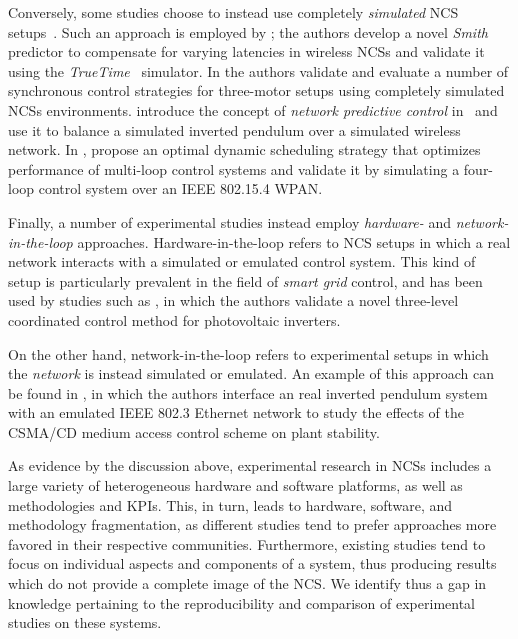 Conversely, some studies choose to instead use completely \emph{simulated} \ac{NCS} setups~\cite{Andersson2005Simulation,Eyisi2012NCSWT}.
Such an approach is employed by \textcite{Du2009Smith}; the authors develop a novel \emph{Smith} predictor to compensate for varying latencies in wireless \acp{NCS} and validate it using the \emph{TrueTime}~\cite{Henriksson2002TrueTime} simulator.
In \textcite{Chen2015synccontrol} the authors validate and evaluate a number of synchronous control strategies for three-motor setups using completely simulated \acp{NCS} environments.
\citeauthor{Wu2012NPC} introduce the concept of \emph{network predictive control} in\ \cite{Wu2012NPC} and use it to balance a simulated inverted pendulum over a simulated wireless network.
In \cite{Ma2019DynamicSched}, \citeauthor{Ma2019DynamicSched} propose an optimal dynamic scheduling strategy that optimizes performance of multi-loop control systems and validate it by simulating a four-loop control system over an IEEE 802.15.4 \ac{WPAN}.


Finally, a number of experimental studies instead employ \emph{hardware-} and \emph{network-in-the-loop} approaches.
Hardware-in-the-loop refers to \ac{NCS} setups in which a real network interacts with a simulated or emulated control system.
This kind of setup is particularly prevalent in the field of \emph{smart grid} control, and has been used by studies such as \textcite{Wang2020VoltageControl}, in which the authors validate a novel three-level coordinated control method for photovoltaic inverters.

On the other hand, network-in-the-loop refers to experimental setups in which the \emph{network} is instead simulated or emulated.
An example of this approach can be found in \textcite{Natale2004InvPendEthernet}, in which the authors interface an real inverted pendulum system with an emulated IEEE 802.3 Ethernet network to study the effects of the \ac{CSMA/CD} medium access control scheme on plant stability.

As evidence by the discussion above, experimental research in \acp{NCS} includes a large variety of heterogeneous hardware and software platforms, as well as methodologies and \acp{KPI}.
This, in turn, leads to hardware, software, and methodology fragmentation, as different studies tend to prefer approaches more favored in their respective communities.
Furthermore, existing studies tend to focus on individual aspects and components of a system, thus producing results which do not provide a complete image of the \ac{NCS}.
We identify thus a gap in knowledge pertaining to the reproducibility and comparison of experimental studies on these systems.

